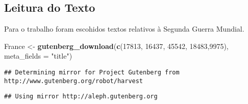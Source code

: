 \documentclass[]{article}
\newenvironment{Shaded}{\begin{snugshade}}{\end{snugshade}}
\newcommand{\DataTypeTok}[1]{\textcolor[rgb]{0.13,0.29,0.53}{#1}}
\newcommand{\DecValTok}[1]{\textcolor[rgb]{0.00,0.00,0.81}{#1}}
\newcommand{\KeywordTok}[1]{\textcolor[rgb]{0.13,0.29,0.53}{\textbf{#1}}}
\newcommand{\NormalTok}[1]{#1}
\newcommand{\StringTok}[1]{\textcolor[rgb]{0.31,0.60,0.02}{#1}}
\begin{document}
\hypertarget{leitura-do-texto}{%
\subsection{Leitura do Texto}\label{leitura-do-texto}}

Para o trabalho foram escohidos textos relativos à Segunda Guerra
Mundial.

\begin{Shaded}
\begin{Highlighting}[]
\NormalTok{France <-}\StringTok{ }\KeywordTok{gutenberg_download}\NormalTok{(}\KeywordTok{c}\NormalTok{(}\DecValTok{17813}\NormalTok{, }\DecValTok{16437}\NormalTok{, }\DecValTok{45542}\NormalTok{, }\DecValTok{18483}\NormalTok{,}\DecValTok{9975}\NormalTok{), }\DataTypeTok{meta_fields =} \StringTok{"title"}\NormalTok{)}
\end{Highlighting}
\end{Shaded}

\begin{verbatim}
## Determining mirror for Project Gutenberg from http://www.gutenberg.org/robot/harvest
\end{verbatim}

\begin{verbatim}
## Using mirror http://aleph.gutenberg.org
\end{verbatim}
\end{document}
